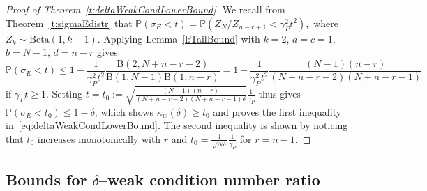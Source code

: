 \documentclass[12pt]{article}
\newcommand{\Bdist}{\mathrm{Beta}}
\newcommand{\Bfun}{\mathrm{B}}
\begin{document}
\begin{proof}[Proof of Theorem~\ref{t:deltaWeakCondLowerBound}]
We recall from Theorem~\ref{t:sigmaEdistr} that
$
 \mathbb{P}(\sigma_E<t) = \mathbb{P}(Z_N/Z_{n-r+1}< \gamma^2_Pt^2),
$
where $Z_k \sim \Bdist(1,k-1)$. Applying Lemma~\ref{l:TailBound} with 
$k=2$, $a = c = 1$, $b=N-1$, $d=n-r$ gives
\[
 \mathbb{P}(\sigma_E<t) \leq 1-\frac{1}{\gamma^2_Pt^2} \frac{\Bfun(2,N+n-r-2)}{\Bfun(1,N-1)\Bfun(1,n-r)} = 1-\frac{1}{\gamma^2_Pt^2} \frac{(N-1)(n-r)}{(N+n-r-2)(N+n-r-1)}
\]
if $\gamma_Pt \ge 1$. Setting $t = t_0:= {\sqrt{\frac{(N-1)(n-r)}{(N+n-r-2)(N+n-r-1)\delta}}}\frac{1}{\gamma_P}$ thus gives $\mathbb{P}(\sigma_E<t_0) \le 1-\delta$, which shows $\kappa_w(\delta)\geq t_0$ and proves the first inequality in~\eqref{eq:deltaWeakCondLowerBound}. The second inequality is shown by noticing that $t_0$ increases monotonically with $r$
and $t_0 = \frac{1}{\sqrt{N\delta}} \frac{1}{\gamma_P}$ for $r = n-1$.
\end{proof}

\subsection{Bounds for $\delta$--weak condition number ratio}
\end{document}
